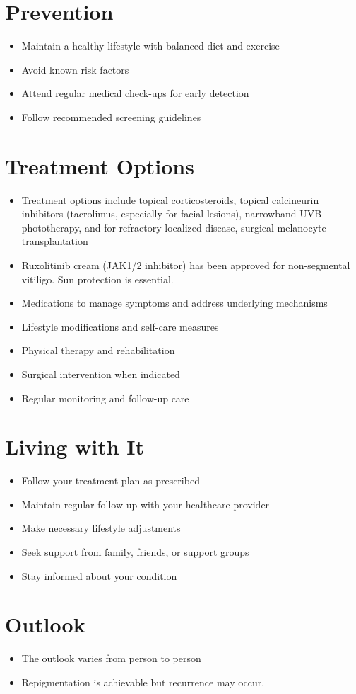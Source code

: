 \section{Prevention}
\begin{itemize}[noitemsep]
  \item Maintain a healthy lifestyle with balanced diet and exercise
  \item Avoid known risk factors
  \item Attend regular medical check-ups for early detection
  \item Follow recommended screening guidelines
\end{itemize}
\section{Treatment Options}
\begin{itemize}[noitemsep]
  \item Treatment options include topical corticosteroids, topical calcineurin inhibitors (tacrolimus, especially for facial lesions), narrowband UVB phototherapy, and for refractory localized disease, surgical melanocyte transplantation
  \item Ruxolitinib cream (JAK1/2 inhibitor) has been approved for non-segmental vitiligo. Sun protection is essential.
  \item Medications to manage symptoms and address underlying mechanisms
  \item Lifestyle modifications and self-care measures
  \item Physical therapy and rehabilitation
  \item Surgical intervention when indicated
  \item Regular monitoring and follow-up care
\end{itemize}
\section{Living with It}
\begin{itemize}[noitemsep]
  \item Follow your treatment plan as prescribed
  \item Maintain regular follow-up with your healthcare provider
  \item Make necessary lifestyle adjustments
  \item Seek support from family, friends, or support groups
  \item Stay informed about your condition
\end{itemize}
\section{Outlook}
\begin{itemize}[noitemsep]
  \item The outlook varies from person to person
  \item Repigmentation is achievable but recurrence may occur.
\end{itemize}
